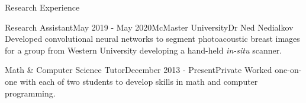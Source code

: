 \begin{rSection}{Research Experience}
\begin{rSubsection}{Research Assistant}{May 2019 - May 2020}{McMaster University}{Dr Ned Nedialkov}
	Developed convolutional neural networks to segment photoacoustic breast images for a group from Western University developing a hand-held \textit{in-situ} scanner.
\end{rSubsection}


\begin{rSubsection}{Math \& Computer Science Tutor}{December 2013 - Present}{Private}{}
	Worked one-on-one with each of two students to develop skills in math and computer programming.
\end{rSubsection}

\end{rSection}